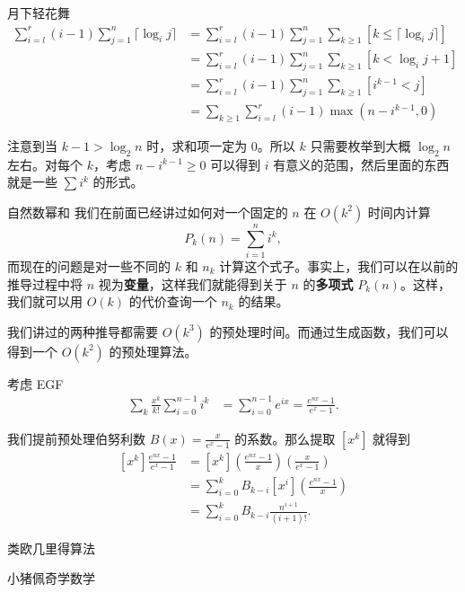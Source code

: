\begin{frame}{月下轻花舞}
    $$
    \begin{aligned}
    \sum_{i=l}^r(i-1)\sum_{j=1}^n\lceil\log_i j\rceil &= \sum_{i=l}^r(i-1)\sum_{j=1}^n\sum_{k\ge 1}[k\le \lceil \log_i j\rceil]\\
    &=\sum_{i=l}^r(i-1)\sum_{j=1}^n\sum_{k\ge 1}[k<\log_i j+1]\\
    &=\sum_{i=l}^r(i-1)\sum_{j=1}^n\sum_{k\ge 1}[i^{k-1}<j]\\
    &=\sum_{k\ge 1}\sum_{i=l}^r(i-1)\max(n-i^{k-1},0)
    \end{aligned}
    $$

    注意到当 $k-1>\log_2 n$ 时，求和项一定为 $0$。所以 $k$ 只需要枚举到大概 $\log_2 n$ 左右。对每个 $k$，考虑 $n-i^{k-1}\ge 0$ 可以得到 $i$ 有意义的范围，然后里面的东西就是一些 $\sum i^k$ 的形式。 
\end{frame}
\begin{frame}{自然数幂和}
    我们在前面已经讲过如何对一个固定的 $n$ 在 $O(k^2)$ 时间内计算
    $$
    P_k(n)=\sum_{i=1}^n i^k,
    $$
    而现在的问题是对一些不同的 $k$ 和 $n_k$ 计算这个式子。事实上，我们可以在以前的推导过程中将 $n$ 视为\textbf{变量}，这样我们就能得到关于 $n$ 的\textbf{多项式} $P_k(n)$。这样，我们就可以用 $O(k)$ 的代价查询一个 $n_k$ 的结果。

    我们讲过的两种推导都需要 $O(k^3)$ 的预处理时间。而通过生成函数，我们可以得到一个 $O(k^2)$ 的预处理算法。
\end{frame}
\begin{frame}
    考虑 EGF
    $$
    \begin{aligned}
    \sum_k \frac{x^k}{k!}\sum_{i=0}^{n-1}i^k&=\sum_{i=0}^{n-1} e^{ix}=\frac{e^{nx}-1}{e^x-1}.
    \end{aligned}
    $$

    我们提前预处理伯努利数 $B(x)=\frac{x}{e^x-1}$ 的系数。那么提取 $[x^k]$ 就得到
    $$
    \begin{aligned}
    [x^k]\frac{e^{nx}-1}{e^x-1}&=[x^k]\left(\frac{e^{nx}-1}{x}\right)\left(\frac{x}{e^x-1}\right)\\
    &=\sum_{i=0}^k B_{k-i}[x^i]\left(\frac{e^{nx}-1}{x}\right)\\
    &=\sum_{i=0}^k B_{k-i}\frac{n^{i+1}}{(i+1)!}.
    \end{aligned}
    $$
\end{frame}
\begin{frame}{类欧几里得算法}
    
\end{frame}
\begin{frame}{小猪佩奇学数学}
    
\end{frame}